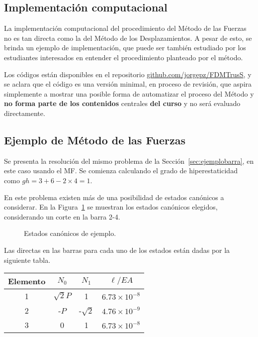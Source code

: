 \subsection{Implementación computacional}

La implementación computacional del procedimiento del Método de las Fuerzas no es tan directa como la del Método de los Desplazamientos. %
%
A pesar de esto, se brinda un ejemplo de implementación, que puede ser también estudiado por los estudiantes interesados en entender el procedimiento planteado por el método. %

Los códigos están disponibles en el repositorio \href{https://github.com/jorgepz/FDMTrusS}{github.com/jorgepz/FDMTrusS}, y se aclara que el código es una versión minimal, en proceso de revisión, que aspira simplemente a mostrar una posible forma de automatizar el proceso del Método y  \textbf{no forma parte de los contenidos} centrales \textbf{del curso} y no será evaluado directamente. %
%



\subsection{Ejemplo de Método de las Fuerzas}

Se presenta la resolución del mismo problema de la Sección~\ref{sec:ejemplobarra}, en este caso usando el MF. %
%
Se comienza calculando el grado de hiperestaticidad como $gh= 3 + 6 - 2 \times 4 = 1$.


En este problema existen más de una posibilidad de estados canónicos a considerar. En la Figura~\ref{fig:hipereje} se muestran los estados canónicos elegidos, considerando un corte en la barra 2-4.

\begin{figure}[htb]
\centering
\def\svgwidth{\textwidth}

\caption{Estados canónicos de ejemplo.}
\label{fig:hipereje}
\end{figure}

Las directas en las barras para cada uno de los estados están dadas por la siguiente tabla.
	\begin{center}
		\begin{tabular}{cccc}
\hline
			Elemento & $N_0$ &  $N_1$ & $ \ell / E A$ \\
			\hline
			1 & $\sqrt{2} P$ & 1 & $6.73 \times 10^{-8}$ \\
			2 & -$P$ & -$\sqrt{2}$ & $4.76 \times 10^{-9}$ \\
			3 & 0 &  1 & $ 6.73 \times 10^{-8}$ \\
			\hline
		\end{tabular}
	\end{center}

